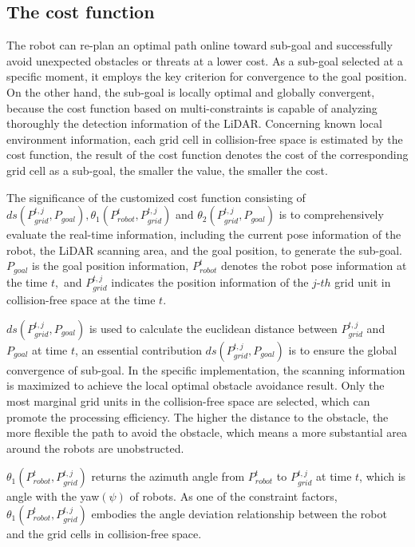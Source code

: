 \documentclass{iosart2c}
\begin{document}
\subsection{The cost function}\label{s3.2}
The robot can re-plan an optimal path online toward sub-goal and successfully avoid unexpected obstacles or threats at a lower cost. As a sub-goal selected at a specific moment, it employs the key criterion for convergence to the goal position. On the other hand, the sub-goal is locally optimal and globally convergent, because the cost function based on multi-constraints is capable of analyzing thoroughly the detection information of the LiDAR. Concerning known local environment information, each grid cell in collision-free space is estimated by the cost function, the result of the cost function denotes the cost of the corresponding grid cell as a sub-goal, the smaller the value, the smaller the cost.

The significance of the customized cost function consisting of $\!d s\left(P_{grid}^{t, j}, P_{goal}\right)\!, \!\theta_{1}\left(P_{{robot}}^{t}, P_{grid}^{t, j}\right)\!$ and $\!\theta_{2}\left(P_{grid}^{t, j}, P_{{goal }}\right)\!$ is to comprehensively evaluate the real-time information, including the current pose information of the robot, the LiDAR scanning area, and the goal position, to generate the sub-goal. $P_{goal}$ is the goal position information, $P_{robot}^{t}$ denotes the robot pose information at the time $t,$ and $P_{{grid }}^{t, j}$ indicates the position information of the $j$-$th$ grid unit in collision-free space at the time $t$.

$\!ds(P_{grid}^{t, j}, P_{goal})\!$ is used to calculate the euclidean distance between $P_{{grid }}^{t, j}$ and $P_{{goal}}$ at time $t$, an essential contribution $\!ds(P_{grid}^{t, j}, P_{goal})\!$ is to ensure the global convergence of sub-goal. In the specific implementation, the scanning information is maximized to achieve the local optimal obstacle avoidance result. Only the most marginal grid units in the collision-free space are selected, which can promote the processing efficiency. The higher the distance to the obstacle, the more flexible the path to avoid the obstacle, which means a more substantial area around the robots are unobstructed.

$\!\theta_{1}(P_{robot}^{t}, P_{grid}^{t, j})\!$ returns the azimuth angle from $P_{robot}^{t}$ to $P_{{grid }}^{t, j}$ at time $t$, which is angle with the yaw$(\psi)$ of robots. As one of the constraint factors, $\!\theta_{1}(P_{robot}^{t}, P_{{grid }}^{t, j})\!$ embodies the angle deviation relationship between the robot and the grid cells in collision-free space.
\end{document}
